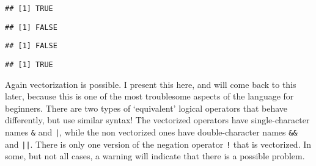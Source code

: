 \documentclass[paper=a4,headsepline,BCOR=12mm,twoside,open=right,%
titlepage,headings=small,fontsize=10pt,index=totoc,bibliography=totoc,%
captions=tableheading,captions=nooneline]{scrbook}\usepackage{knitr}
\begin{document}
\begin{knitrout}\footnotesize
{}\color{fgcolor}\begin{kframe}
\begin{alltt}
 \hlkwb{<-} 
 \hlkwb{<-} 
\end{alltt}
\begin{verbatim}
## [1] TRUE
\end{verbatim}
\begin{alltt}
\hlopt{!} 
\end{alltt}
\begin{verbatim}
## [1] FALSE
\end{verbatim}
\begin{alltt}
 \hlopt{&&}  
\end{alltt}
\begin{verbatim}
## [1] FALSE
\end{verbatim}
\begin{alltt}
 \hlopt{||}  
\end{alltt}
\begin{verbatim}
## [1] TRUE
\end{verbatim}
\end{kframe}
\end{knitrout}

Again vectorization is possible. I present this here, and will come back to this later, because this is one of the most troublesome aspects of the \R language for beginners. There are two types of `equivalent' logical operators that behave differently, but use similar syntax! The vectorized operators have single-character names \verb|&| and \verb:|:, while the non vectorized ones have double-character names \verb|&&| and \verb:||:. There is only one version of the negation operator \verb|!| that is vectorized. In some, but not all cases, a warning will indicate that there is a possible problem.
\end{document}
